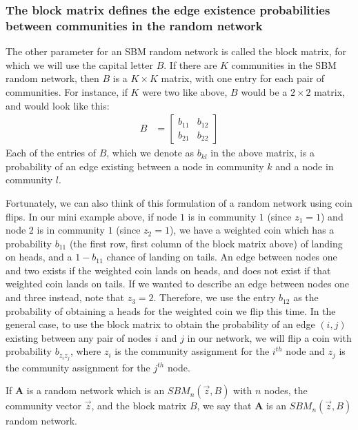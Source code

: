 \documentclass[letterpaper,10pt,english]{jupyterBook}
\begin{document}
\subsubsection{The block matrix defines the edge existence probabilities between communities in the random network}
\label{\detokenize{representations/ch5/single-network-models_SBM:the-block-matrix-defines-the-edge-existence-probabilities-between-communities-in-the-random-network}}
\sphinxAtStartPar
The other parameter for an SBM random network is called the block matrix, for which we will use the capital letter \(B\). If there are \(K\) communities in the SBM random network, then \(B\) is a \(K \times K\) matrix, with one entry for each pair of communities. For instance, if \(K\) were two like above, \(B\) would be a \(2 \times 2\) matrix, and would look like this:
\begin{align*}
    B &= \begin{bmatrix}
        b_{11} & b_{12} \\ b_{21} & b_{22}
    \end{bmatrix}
\end{align*}
\sphinxAtStartPar
Each of the entries of \(B\), which we denote as \(b_{kl}\) in the above matrix, is a probability of an edge existing between a node in community \(k\) and a node in community \(l\).

\sphinxAtStartPar
Fortunately, we can also think of this formulation of a random network using coin flips. In our mini example above, if node \(1\) is in community \(1\) (since \(z_1 = 1\)) and node \(2\) is in community \(1\) (since \(z_2 = 1\)), we have a weighted coin which has a probability \(b_{11}\) (the first row, first column of the block matrix above) of landing on heads, and a \(1 - b_{11}\) chance of landing on tails. An edge between nodes one and two exists if the weighted coin lands on heads, and does not exist if that weighted coin lands on tails. If we wanted to describe an edge between nodes one and three instead, note that \(z_3 = 2\). Therefore, we use the entry \(b_{12}\) as the probability of obtaining a heads for the weighted coin we flip this time. In the general case, to use the block matrix to obtain the probability of an edge \((i, j)\) existing between any pair of nodes \(i\) and \(j\) in our network, we will flip a coin with probability \(b_{z_i z_j}\), where \(z_i\) is the community assignment for the \(i^{th}\) node and \(z_j\) is the community assignment for the \(j^{th}\) node.

\sphinxAtStartPar
If \(\mathbf A\) is a random network which is an \(SBM_n(\vec z, B)\) with \(n\) nodes, the community vector \(\vec z\), and the block matrix \(B\), we say that \(\mathbf A\) is an \(SBM_n(\vec z, B)\) random network.
\end{document}
